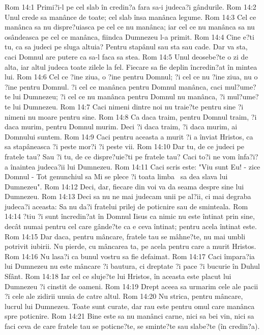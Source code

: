 Rom 14:1  Primi?i-l pe cel slab în credin?a fara sa-i judeca?i gândurile.
Rom 14:2  Unul crede sa manânce de toate; cel slab însa manânca legume.
Rom 14:3  Cel ce manânca sa nu dispre?uiasca pe cel ce nu manânca; iar cel ce nu manânca sa nu osândeasca pe cel ce manânca, fiindca Dumnezeu l-a primit.
Rom 14:4  Cine e?ti tu, ca sa judeci pe sluga altuia? Pentru stapânul sau sta sau cade. Dar va sta, caci Domnul are putere ca sa-l faca sa stea.
Rom 14:5  Unul deosebe?te o zi de alta, iar altul judeca toate zilele la fel. Fiecare sa fie deplin încredin?at în mintea lui.
Rom 14:6  Cel ce ?ine ziua, o ?ine pentru Domnul; ?i cel ce nu ?ine ziua, nu o ?ine pentru Domnul. ?i cel ce manânca pentru Domnul manânca, caci mul?ume?te lui Dumnezeu; ?i cel ce nu manânca pentru Domnul nu manânca, ?i mul?ume?te lui Dumnezeu.
Rom 14:7  Caci nimeni dintre noi nu traie?te pentru sine ?i nimeni nu moare pentru sine.
Rom 14:8  Ca daca traim, pentru Domnul traim, ?i daca murim, pentru Domnul murim. Deci ?i daca traim, ?i daca murim, ai Domnului suntem.
Rom 14:9  Caci pentru aceasta a murit ?i a înviat Hristos, ca sa stapâneasca ?i peste mor?i ?i peste vii.
Rom 14:10  Dar tu, de ce judeci pe fratele tau? Sau ?i tu, de ce dispre?uie?ti pe fratele tau? Caci to?i ne vom înfa?i?a înaintea judeca?ii lui Dumnezeu.
Rom 14:11  Caci scris este: "Viu sunt Eu! - zice Domnul - Tot genunchiul sa Mi se plece ?i toata limba  sa dea slava lui Dumnezeu".
Rom 14:12  Deci, dar, fiecare din voi va da seama despre sine lui Dumnezeu.
Rom 14:13  Deci sa nu ne mai judecam unii pe al?ii, ci mai degraba judeca?i aceasta: Sa nu da?i fratelui prilej de poticnire sau de sminteala.
Rom 14:14  ?tiu ?i sunt încredin?at în Domnul Iisus ca nimic nu este întinat prin sine, decât numai pentru cel care gânde?te ca e ceva întinat; pentru acela întinat este.
Rom 14:15  Dar daca, pentru mâncare, fratele tau se mâhne?te, nu mai umbli potrivit iubirii. Nu pierde, cu mâncarea ta, pe acela pentru care a murit Hristos.
Rom 14:16  Nu lasa?i ca bunul vostru sa fie defaimat.
Rom 14:17  Caci împara?ia lui Dumnezeu nu este mâncare ?i bautura, ci dreptate ?i pace ?i bucurie în Duhul Sfânt.
Rom 14:18  Iar cel ce sluje?te lui Hristos, în aceasta este placut lui Dumnezeu ?i cinstit de oameni.
Rom 14:19  Drept aceea sa urmarim cele ale pacii ?i cele ale zidirii unuia de catre altul.
Rom 14:20  Nu strica, pentru mâncare, lucrul lui Dumnezeu. Toate sunt curate, dar rau este pentru omul care manânca spre poticnire.
Rom 14:21  Bine este sa nu manânci carne, nici sa bei vin, nici sa faci ceva de care fratele tau se poticne?te, se sminte?te sau slabe?te (în credin?a).
